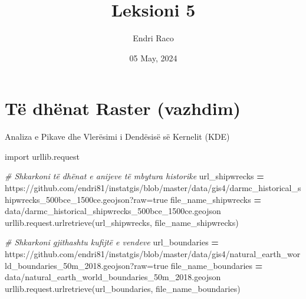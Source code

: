 \documentclass[
  ignorenonframetext,
]{beamer}
\title{Leksioni 5}
\author{Endri Raco}
\date{05 May, 2024}
\newenvironment{Shaded}{\begin{snugshade}}{\end{snugshade}}
\newcommand{\CommentTok}[1]{\textcolor[rgb]{0.56,0.35,0.01}{\textit{#1}}}
\newcommand{\ImportTok}[1]{#1}
\newcommand{\NormalTok}[1]{#1}
\newcommand{\OperatorTok}[1]{\textcolor[rgb]{0.81,0.36,0.00}{\textbf{#1}}}
\newcommand{\StringTok}[1]{\textcolor[rgb]{0.31,0.60,0.02}{#1}}
\begin{document}
\frame{\titlepage}

\begin{frame}[allowframebreaks]
  \tableofcontents[hideallsubsections]
\end{frame}
\hypertarget{tuxeb-dhuxebnat-raster-vazhdim}{%
\section{Të dhënat Raster
(vazhdim)}\label{tuxeb-dhuxebnat-raster-vazhdim}}

\begin{frame}[fragile]{Analiza e Pikave dhe Vlerësimi i Dendësisë së
Kernelit (KDE)}
\protect\hypertarget{analiza-e-pikave-dhe-vleruxebsimi-i-denduxebsisuxeb-suxeb-kernelit-kde}{}

\begin{Shaded}
\begin{Highlighting}[]
\ImportTok{import}\NormalTok{ urllib.request}

\CommentTok{\# Shkarkoni të dhënat e anijeve të mbytura historike}
\NormalTok{url\_shipwrecks }\OperatorTok{=} \StringTok{\textquotesingle{}https://github.com/endri81/instatgis/blob/master/data/gis4/darmc\_historical\_shipwrecks\_500bce\_1500ce.geojson?raw=true\textquotesingle{}}
\NormalTok{file\_name\_shipwrecks }\OperatorTok{=} \StringTok{\textquotesingle{}data/darmc\_historical\_shipwrecks\_500bce\_1500ce.geojson\textquotesingle{}}
\NormalTok{urllib.request.urlretrieve(url\_shipwrecks, file\_name\_shipwrecks)}

\CommentTok{\# Shkarkoni gjithashtu kufijtë e vendeve}
\NormalTok{url\_boundaries }\OperatorTok{=} \StringTok{\textquotesingle{}https://github.com/endri81/instatgis/blob/master/data/gis4/natural\_earth\_world\_boundaries\_50m\_2018.geojson?raw=true\textquotesingle{}}
\NormalTok{file\_name\_boundaries }\OperatorTok{=} \StringTok{\textquotesingle{}data/natural\_earth\_world\_boundaries\_50m\_2018.geojson\textquotesingle{}}
\NormalTok{urllib.request.urlretrieve(url\_boundaries, file\_name\_boundaries)}
\end{Highlighting}
\end{Shaded}
\end{frame}
\end{document}
